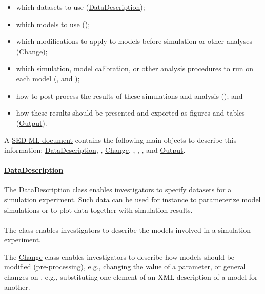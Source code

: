\begin{itemize}
\item which datasets to use (\hyperref[class:dataDescription]{DataDescription});
\item which models to use (\Model);
\item which modifications to apply to models before simulation or other analyses (\hyperref[class:change]{Change});
\item which simulation, model calibration, or other analysis procedures to run on each model (\Simulation, and \AbstractTask);
\item how to post-process the results of these simulations and analysis (\DataGenerator); and
\item how these results should be presented and exported as figures and tables (\hyperref[class:output]{Output}).
\end{itemize}

A \hyperref[class:sed-ml]{SED-ML document} contains the following main objects to describe this information: \hyperref[class:dataDescription]{DataDescription}, \Model, \hyperref[class:change]{Change}, \Simulation, \AbstractTask, \DataGenerator, and \hyperref[class:output]{Output}.

\paragraph*{\hyperref[class:dataDescription]{DataDescription}}
The \hyperref[class:dataDescription]{DataDescription} class enables investigators to specify datasets for a simulation experiment. Such data can be used for instance to parameterize model simulations or to plot data together with simulation results.

\paragraph*{\Model}
The \Model class enables investigators to describe the models involved in a simulation experiment.

The \hyperref[class:change]{Change} class enables investigators to describe how models should be modified (pre-processing), e.g., changing the value of a parameter, or general changes on , e.g., substituting one element of an XML description of a model for another.


